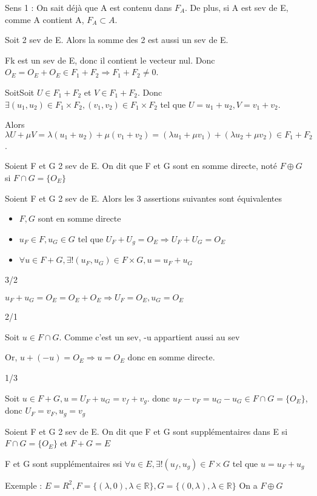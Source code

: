 \documentclass[french]{yLectureNote}
\newcommand{\R}[0]{\mathbb{R}}
\begin{document}
Sens 1 : On sait déjà que A est contenu dans \(F_A\). De plus, si A est sev de E, comme A contient A, \(F_A\subset A\).
\begin{proposition}
Soit 2 sev de E. Alors la somme des 2 est aussi un sev de E.
\end{proposition}
\begin{myproof}
Fk est un sev de E, donc il contient le vecteur nul. Donc \(O_E=O_E+O_E \in F_1+F_2 \Rightarrow F_1+F_2\neq 0\).

SoitSoit \(U\in F_1+F_2\) et \(V\in F_1+F_2\). Donc \(\exists (u_1,u_2)\in F_1\times F_2, (v_1, v_2)\in F_1\times F_2 \) tel que \(U = u_1+u_2, V=v_1+v_2\).

Alors \(\lambda U+\mu V = \lambda (u_1+u_2) + \mu(v_1+v_2) = (\lambda u_1+\mu v_1) + (\lambda u_2+\mu v_2)\in F_1+F_2\).
\end{myproof}
\begin{definition}
Soient F et G 2 sev de E. On dit que F et G sont en somme directe, noté \(F\oplus G\) si \(F\cap G = \{O_E\}\)
\end{definition}
\begin{proposition}
Soient F et G 2 sev de E. Alors les 3 assertions suivantes sont équivalentes
\begin{itemize}
 \item \(F, G\) sont en somme directe
 \item \(u_F\in F, u_G\in G\) tel que \(U_F+U_g = O_E \Rightarrow U_F+U_G = O_E\)
 \item \(\forall u\in F+G, \exists! (u_F,u_G)\in F \times G, u = u_F+u_G\)
\end{itemize}
\end{proposition}
\begin{myproof}
3/2

\(u_F+u_G = O_E = O_E+O_E \Rightarrow U_F=O_E, u_G=O_E\)

2/1

Soit \(u\in F\cap G\). Comme c'est un sev, -u appartient aussi au sev

Or, \(u + (-u) = O_E \Rightarrow u = O_E\) donc en somme directe.

1/3

Soit \(u\in F+G, u = U_F+u_G = v_f+v_g\). donc \(u_F-v_F=u_G-u_G \in F\cap G = \{O_E\}\), donc \(U_F=v_F, u_g=v_g\)
\end{myproof}
\begin{definition}
Soient F et G 2 sev de E. On dit que F et G sont supplémentaires dans E si \(F\cap G = \{O_E\}\) et \(F+G = E\)
\end{definition}
\begin{proposition}
F et G sont supplémentaires ssi \(\forall u\in E, \exists ! (u_f,u_g)\in F\times G\) tel que \(u=u_F+u_g\)
\end{proposition}
Exemple : \(E=R^2, F = \{(\lambda, 0),\lambda \in \R\}, G = \{(0,\lambda),\lambda \in \R\}\) On a \(F\oplus G\)
\end{document}
